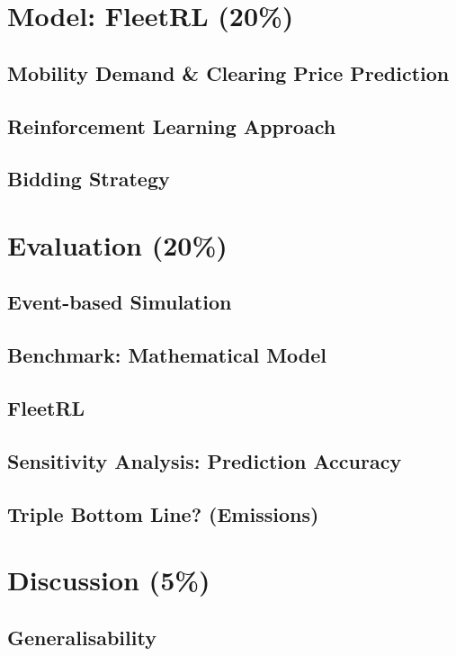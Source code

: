 \documentclass[a4paper]{article}
\begin{document}
\section{Model: FleetRL (20\%)}
\label{sec:orgd147882}
\subsection{Mobility Demand \& Clearing Price Prediction}
\label{sec:org985b7cc}
\subsection{Reinforcement Learning Approach}
\label{sec:org7bafca3}
\subsection{Bidding Strategy}
\label{sec:orgf269061}

\section{Evaluation (20\%)}
\label{sec:org264cd7f}
\subsection{Event-based Simulation}
\label{sec:orgda206f3}
\subsection{Benchmark: Mathematical Model}
\label{sec:orgd796a1f}
\subsection{FleetRL}
\label{sec:orgbe3f743}
\subsection{Sensitivity Analysis: Prediction Accuracy}
\label{sec:orgf0664e5}
\subsection{Triple Bottom Line? (Emissions)}
\label{sec:orgf23174e}

\section{Discussion (5\%)}
\label{sec:orgc1545b5}
\subsection{Generalisability}
\label{sec:orge56b3f6}
\end{document}
